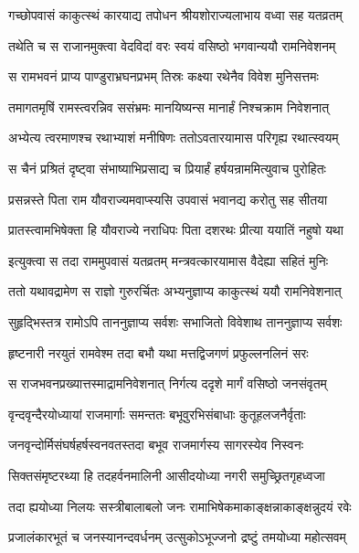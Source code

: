 \twolineshloka
{गच्छोपवासं काकुत्स्थं कारयाद्य तपोधन}
{श्रीयशोराज्यलाभाय वध्वा सह यतव्रतम्} %

\twolineshloka
{तथेति च स राजानमुक्त्वा वेदविदां वरः}
{स्वयं वसिष्ठो भगवान्ययौ रामनिवेशनम्} %

\twolineshloka
{स रामभवनं प्राप्य पाण्डुराभ्रघनप्रभम्}
{तिस्रः कक्ष्या रथेनैव विवेश मुनिसत्तमः} %

\twolineshloka
{तमागतमृषिं रामस्त्वरन्निव ससंभ्रमः}
{मानयिष्यन्स मानार्हं निश्चक्राम निवेशनात्} %

\twolineshloka
{अभ्येत्य त्वरमाणश्च रथाभ्याशं मनीषिणः}
{ततोऽवतारयामास परिगृह्य रथात्स्वयम्} %

\twolineshloka
{स चैनं प्रश्रितं दृष्ट्वा संभाष्याभिप्रसाद्य च}
{प्रियार्हं हर्षयन्राममित्युवाच पुरोहितः} %

\twolineshloka
{प्रसन्नस्ते पिता राम यौवराज्यमवाप्स्यसि}
{उपवासं भवानद्य करोतु सह सीतया} %

\twolineshloka
{प्रातस्त्वामभिषेक्ता हि यौवराज्ये नराधिपः}
{पिता दशरथः प्रीत्या ययातिं नहुषो यथा} %

\twolineshloka
{इत्युक्त्वा स तदा राममुपवासं यतव्रतम्}
{मन्त्रवत्कारयामास वैदेह्या सहितं मुनिः} %

\twolineshloka
{ततो यथावद्रामेण स राज्ञो गुरुरर्चितः}
{अभ्यनुज्ञाप्य काकुत्स्थं ययौ रामनिवेशनात्} %

\twolineshloka
{सुहृद्भिस्तत्र रामोऽपि ताननुज्ञाप्य सर्वशः}
{सभाजितो विवेशाथ ताननुज्ञाप्य सर्वशः} %

\twolineshloka
{हृष्टनारी नरयुतं रामवेश्म तदा बभौ}
{यथा मत्तद्विजगणं प्रफुल्लनलिनं सरः} %

\twolineshloka
{स राजभवनप्रख्यात्तस्माद्रामनिवेशनात्}
{निर्गत्य ददृशे मार्गं वसिष्ठो जनसंवृतम्} %

\twolineshloka
{वृन्दवृन्दैरयोध्यायां राजमार्गाः समन्ततः}
{बभूवुरभिसंबाधाः कुतूहलजनैर्वृताः} %

\twolineshloka
{जनवृन्दोर्मिसंघर्षहर्षस्वनवतस्तदा}
{बभूव राजमार्गस्य सागरस्येव निस्वनः} %

\twolineshloka
{सिक्तसंमृष्टरथ्या हि तदहर्वनमालिनी}
{आसीदयोध्या नगरी समुच्छ्रितगृहध्वजा} %

\twolineshloka
{तदा ह्ययोध्या निलयः सस्त्रीबालाबलो जनः}
{रामाभिषेकमाकाङ्क्षन्नाकाङ्क्षन्नुदयं रवेः} %

\twolineshloka
{प्रजालंकारभूतं च जनस्यानन्दवर्धनम्}
{उत्सुकोऽभूज्जनो द्रष्टुं तमयोध्या महोत्सवम्} %

